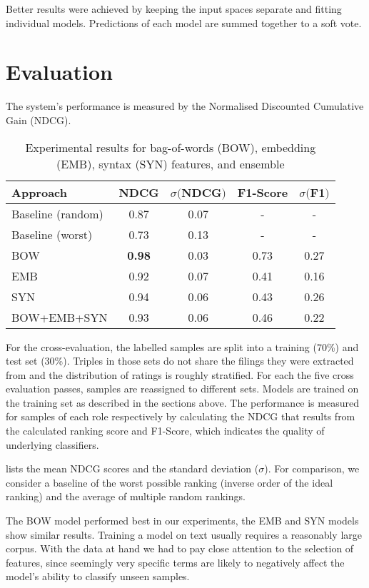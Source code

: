 Better results were achieved by keeping the input spaces separate and fitting individual models.
Predictions of each model are summed together to a soft vote.

\section{Evaluation}



The system's performance is measured by the Normalised Discounted Cumulative Gain (NDCG)\cite{ir}.
\begin{table}[H]
	\caption{Experimental results for bag-of-words (BOW), embedding (EMB), syntax (SYN) features, and ensemble}
	\label{tab:results}
	\begin{tabular}{lcccc}
		\toprule
		Approach & NDCG & $\sigma ($NDCG$)$ & F1-Score &  $\sigma ($F1$)$\\
		\midrule
		Baseline (random) & 0.87 & 0.07 & - & - \\
		Baseline (worst)  & 0.73 & 0.13 & - & - \\
		\midrule
		BOW & \textbf{0.98} & 0.03 & 0.73 & 0.27\\
		EMB & 0.92 & 0.07 & 0.41 & 0.16\\
		SYN & 0.94 & 0.06 & 0.43 & 0.26 \\
		BOW+EMB+SYN& 0.93 & 0.06 & 0.46 & 0.22\\
		\bottomrule
	\end{tabular}
\end{table}
For the cross-evaluation, the labelled samples are split into a training (70\%) and test set (30\%).
Triples in those sets do not share the filings they were extracted from and the distribution of ratings is roughly stratified.
For each the five cross evaluation passes, samples are reassigned to different sets.
Models are trained on the training set as described in the sections above.
The performance is measured for samples of each role respectively by calculating the NDCG that results from the calculated ranking score and F1-Score, which indicates the quality of underlying classifiers.

 lists the mean NDCG scores and the standard deviation ($\sigma$).
For comparison, we consider a baseline of the worst possible ranking (inverse order of the ideal ranking) and the average of multiple random rankings.

The BOW model performed best in our experiments, the EMB and SYN models show similar results. 
Training a model on text usually requires a reasonably large corpus.
With the data at hand we had to pay close attention to the selection of features, since seemingly very specific terms are likely to negatively affect the model's ability to classify unseen samples.

